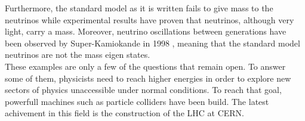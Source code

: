     Furthermore, the standard model as it is written fails to give mass to the neutrinos while experimental results have proven that neutrinos, although very light, carry a mass. Moreover, neutrino oscillations between generations have been observed by Super-Kamiokande in 1998 \cite{Fukuda:1998mi}, meaning that the standard model neutrinos are not the mass eigen states. \\

    These examples are only a few of the questions that remain open. To answer some of them, physicists need to reach higher energies in order to explore new sectors of physics unaccessible under normal conditions. To reach that goal, powerfull machines such as particle colliders have been build. The latest achivement in this field is the construction of the LHC at CERN.
